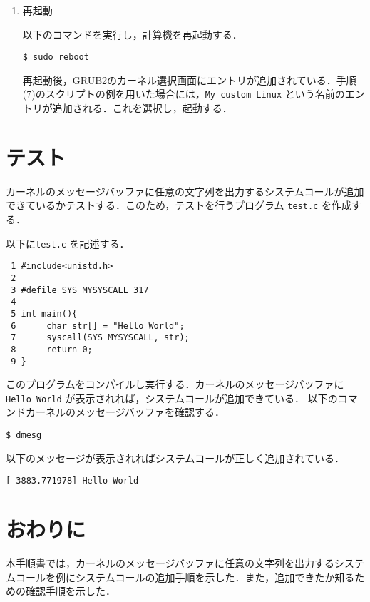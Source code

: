 \documentclass[12pt]{jsarticle}
\begin{document}
\begin{enumerate}
\begin{enumerate}
\end{enumerate}

\item 再起動

以下のコマンドを実行し，計算機を再起動する．
\begin{verbatim}
$ sudo reboot
\end{verbatim}
再起動後，GRUB2のカーネル選択画面にエントリが追加されている．手順(7)のスクリプトの例を用いた場合には，\verb|My custom Linux| という名前のエントリが追加される．これを選択し，起動する．


\end{enumerate}




\section{テスト}\label{sec:test}

カーネルのメッセージバッファに任意の文字列を出力するシステムコールが追加できているかテストする．このため，テストを行うプログラム \verb|test.c| を作成する．

以下に\verb|test.c| を記述する．
\begin{verbatim}
 1 #include<unistd.h>
 2
 3 #defile SYS_MYSYSCALL 317
 4
 5 int main(){
 6      char str[] = "Hello World";
 7      syscall(SYS_MYSYSCALL, str);
 8      return 0;
 9 }
\end{verbatim}
このプログラムをコンパイルし実行する．カーネルのメッセージバッファに\verb|Hello World| が表示されれば，システムコールが追加できている．
以下のコマンドカーネルのメッセージバッファを確認する．
\begin{verbatim}
$ dmesg
\end{verbatim}
以下のメッセージが表示されればシステムコールが正しく追加されている．
\begin{verbatim}
[ 3883.771978] Hello World
\end{verbatim}

\section{おわりに}\label{sec:conclusion}
本手順書では，カーネルのメッセージバッファに任意の文字列を出力するシステムコールを例にシステムコールの追加手順を示した．また，追加できたか知るための確認手順を示した．
\end{document}
